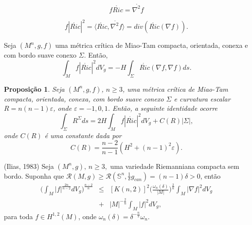 \documentclass[blue]{beamer}
\newtheorem{proposition}{Proposição}
\begin{document}
\begin{frame}

$$f\mathring{Ric}=\mathring{\nabla^{2}f}$$

\begin{equation*}
\label{divric}
f|\mathring{Ric}|^2 = \langle \mathring{Ric}, \mathring{\nabla^2 f}\rangle = div(\mathring{Ric}(\nabla f)).
\end{equation*}
\begin{lemma}Seja $(M^n ,g, f)$ uma métrica crítica de Miao-Tam compacta, orientada, conexa e com bordo suave conexo $\Sigma$. Então,
	\begin{equation*}
	\int_{M}f|\mathring{Ric}|^2 dV_{g} = -H\int_{\Sigma}\mathring{Ric}(\nabla f, \nabla f) ds.
	\end{equation*}
\end{lemma}
\end{frame}

\begin{frame}
\begin{proposition}\label{intRbound}
	Seja $(M^n, g, f)$, $n\geq 3$, uma métrica crítica de Miao-Tam compacta, orientada, conexa, com bordo suave conexo $\Sigma$ e curvatura escalar $R= n(n-1)\varepsilon$, onde $\varepsilon = -1, 0, 1$. Então, a seguinte identidade ocorre
	\begin{equation*}
	\int_{\Sigma} R^{\Sigma} ds = 2H \int_{M} f|\mathring{Ric}|^2 dV_{g} + C(R)|\Sigma|,
	\end{equation*}onde $C(R)$ é uma constante dada por $$C(R)=\frac{n-2}{n-1}(H^2 + (n-1)^2\varepsilon).$$
\end{proposition}
\end{frame}







\begin{frame}
\begin{block}{(Ilias, 1983)}
Seja $(M^n , g),\,n\ge 3,$ uma variedade Riemanniana compacta sem bordo. Suponha que $\mathcal{R}(M, g)\geq \mathcal{R}(\mathbb{S}^n , \frac{1}{\delta}g_{can})=(n-1)\delta>0$, então
\begin{eqnarray*}
\Big(\int_{M} |f|^{\frac{2n}{n-2}} dV_{g}\Big)^{\frac{n-2}{n}}&\leq &[K(n,2)]^2 \Big(\frac{\omega_{n}(\delta)}{|M|}\Big)^{\frac{2}{n}} \int_{M}|\nabla f|^2 dV_{g}\\
& +& |M|^{-\frac{2}{n}}\int_{M} |f|^2 dV_{g},
\end{eqnarray*}
para toda $f\in H^{1,2}(M)$, onde $\omega_{n}(\delta)=\delta^{-\frac{n}{2}}\omega_{n}$.
\end{block}

\end{frame}
\end{document}
